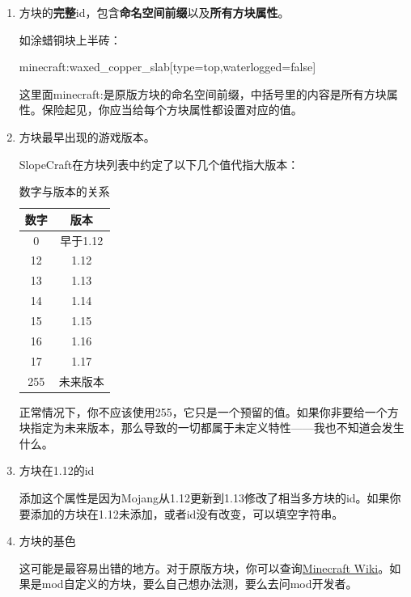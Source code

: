 \documentclass{article}
\begin{document}
   \begin{enumerate}
       \item 方块的\textbf{完整}id，包含\textbf{命名空间前缀}以及\textbf{所有方块属性}。
       
       如涂蜡铜块上半砖：
       
       minecraft:waxed\_copper\_slab[type=top,waterlogged=false]

       这里面minecraft:是原版方块的命名空间前缀，中括号里的内容是所有方块属性。保险起见，你应当给每个方块属性都设置对应的值。
       \item 方块最早出现的游戏版本。
       
       SlopeCraft在方块列表中约定了以下几个值代指大版本：
       \begin{table}[h]
        \centering
        \caption{数字与版本的关系}
        \label{VerAndRealVer}
        \begin{tabular}{cc}\hline
            数字 & 版本 \\ \hline
            0 & 早于1.12 \\
            12 & 1.12 \\
            13 & 1.13 \\
            14 & 1.14 \\
            15 & 1.15 \\
            16 & 1.16 \\
            17 & 1.17 \\
            255 & 未来版本 \\
            \hline            
        \end{tabular}
       \end{table}

   正常情况下，你不应该使用255，它只是一个预留的值。如果你非要给一个方块指定为未来版本，那么导致的一切都属于未定义特性——我也不知道会发生什么。

   \item 方块在1.12的id
   
   添加这个属性是因为Mojang从1.12更新到1.13修改了相当多方块的id。如果你要添加的方块在1.12未添加，或者id没有改变，可以填空字符串。
   \item 方块的基色
   
   这可能是最容易出错的地方。对于原版方块，你可以查询\href{https://wiki.biligame.com/mc/%E5%9C%B0%E5%9B%BE%E7%89%A9%E5%93%81%E6%A0%BC%E5%BC%8F#idcounts.dat_.E6.A0.BC.E5.BC.8F}{Minecraft Wiki}。如果是mod自定义的方块，要么自己想办法测，要么去问mod开发者。
   

\end{enumerate}
\end{document}
